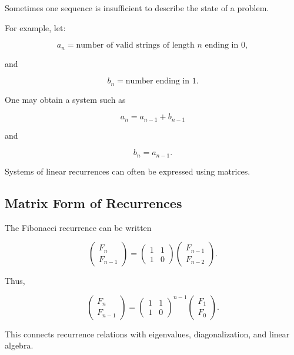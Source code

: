 Sometimes one sequence is insufficient to describe the state of a
problem.

For example, let:

\[
a_n
=
\text{number of valid strings of length }n\text{ ending in }0,
\]

and

\[
b_n
=
\text{number ending in }1.
\]

One may obtain a system such as

\[
\boxed{
a_n=a_{n-1}+b_{n-1}
}
\]

and

\[
\boxed{
b_n=a_{n-1}.
}
\]

Systems of linear recurrences can often be expressed using matrices.

\subsection{Matrix Form of Recurrences}
\label{subsec:matrix-form-recurrence}

The Fibonacci recurrence can be written

\[
\begin{pmatrix}
F_n\\
F_{n-1}
\end{pmatrix}
=
\begin{pmatrix}
1&1\\
1&0
\end{pmatrix}
\begin{pmatrix}
F_{n-1}\\
F_{n-2}
\end{pmatrix}.
\]

Thus,

\[
\boxed{
\begin{pmatrix}
F_n\\
F_{n-1}
\end{pmatrix}
=
\begin{pmatrix}
1&1\\
1&0
\end{pmatrix}^{n-1}
\begin{pmatrix}
F_1\\
F_0
\end{pmatrix}.
}
\]

This connects recurrence relations with eigenvalues, diagonalization,
and linear algebra.


